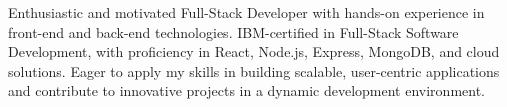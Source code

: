 

\begin{cvparagraph}

Enthusiastic and motivated Full-Stack Developer with hands-on experience in front-end and back-end technologies. IBM-certified in Full-Stack Software Development, with proficiency in React, Node.js, Express, MongoDB, and cloud solutions. Eager to apply my skills in building scalable, user-centric applications and contribute to innovative projects in a dynamic development environment.

\end{cvparagraph}
